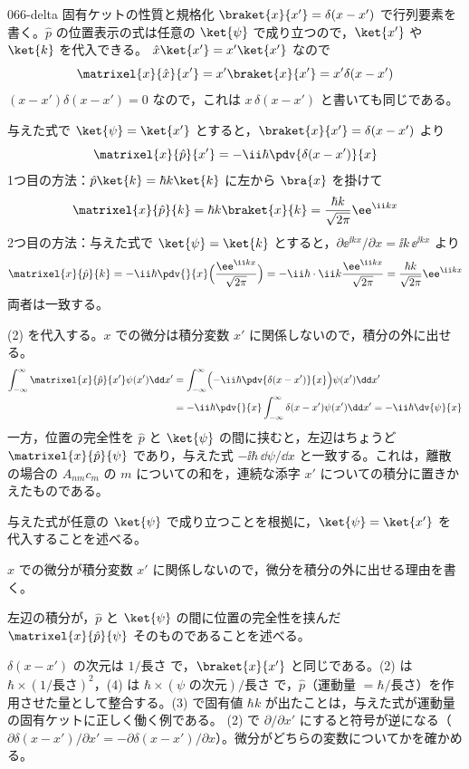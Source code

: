\documentclass[uplatex,dvipdfmx,a4paper,11pt]{jsarticle}
\begin{document}
\begin{kaisetsu}{066-delta}
\houshin 固有ケットの性質と規格化 $\braket{x}{x'}=\delta(x-x')$ で行列要素を書く。$\hat{p}$ の位置表示の式は任意の $\ket{\psi}$ で成り立つので，$\ket{x'}$ や $\ket{k}$ を代入できる。
\keisan {} $\hat{x}\ket{x'}=x'\ket{x'}$ なので
\[ \matrixel{x}{\hat{x}}{x'}=x'\braket{x}{x'}=x'\delta(x-x') \]
$(x-x')\delta(x-x')=0$ なので，これは $x\,\delta(x-x')$ と書いても同じである。

 与えた式で $\ket{\psi}=\ket{x'}$ とすると，$\braket{x}{x'}=\delta(x-x')$ より
\[ \matrixel{x}{\hat{p}}{x'}=-\ii\hbar\pdv{\delta(x-x')}{x} \]
 1つ目の方法：$\hat{p}\ket{k}=\hbar k\ket{k}$ に左から $\bra{x}$ を掛けて
\[ \matrixel{x}{\hat{p}}{k}=\hbar k\braket{x}{k}=\frac{\hbar k}{\sqrt{2\pi}}\ee^{\ii kx} \]
2つ目の方法：与えた式で $\ket{\psi}=\ket{k}$ とすると，$\partial\ee^{\ii kx}/\partial x=\ii k\,\ee^{\ii kx}$ より
\[ \matrixel{x}{\hat{p}}{k}=-\ii\hbar\pdv{}{x}\Bigl(\frac{\ee^{\ii kx}}{\sqrt{2\pi}}\Bigr)=-\ii\hbar\cdot\ii k\frac{\ee^{\ii kx}}{\sqrt{2\pi}}=\frac{\hbar k}{\sqrt{2\pi}}\ee^{\ii kx} \]
両者は一致する。

 (2) を代入する。$x$ での微分は積分変数 $x'$ に関係しないので，積分の外に出せる。
\begin{align*}
\int_{-\infty}^{\infty}\matrixel{x}{\hat{p}}{x'}\psi(x')\dd x'
&=\int_{-\infty}^{\infty}\Bigl(-\ii\hbar\pdv{\delta(x-x')}{x}\Bigr)\psi(x')\dd x'\\
&=-\ii\hbar\pdv{}{x}\int_{-\infty}^{\infty}\delta(x-x')\psi(x')\dd x'=-\ii\hbar\dv{\psi}{x}
\end{align*}
一方，位置の完全性を $\hat{p}$ と $\ket{\psi}$ の間に挟むと，左辺はちょうど $\matrixel{x}{\hat{p}}{\psi}$ であり，与えた式 $-\ii\hbar\,\dd\psi/\dd x$ と一致する。これは，離散の場合の $A_{nm}c_{m}$ の $m$ についての和を，連続な添字 $x'$ についての積分に置きかえたものである。
\begin{ronten}
  \item {} 与えた式が任意の $\ket{\psi}$ で成り立つことを根拠に，$\ket{\psi}=\ket{x'}$ を代入することを述べる。
  \item {} $x$ での微分が積分変数 $x'$ に関係しないので，微分を積分の外に出せる理由を書く。
  \item {} 左辺の積分が，$\hat{p}$ と $\ket{\psi}$ の間に位置の完全性を挟んだ $\matrixel{x}{\hat{p}}{\psi}$ そのものであることを述べる。
\end{ronten}
\kenzan $\delta(x-x')$ の次元は $1/\text{長さ}$ で，$\braket{x}{x'}$ と同じである。(2) は $\hbar\times(1/\text{長さ})^{2}$，(4) は $\hbar\times(\psi\text{ の次元})/\text{長さ}$ で，$\hat{p}$（運動量 $=\hbar/\text{長さ}$）を作用させた量として整合する。(3) で固有値 $\hbar k$ が出たことは，与えた式が運動量の固有ケットに正しく働く例である。
\tsumazuki (2) で $\partial/\partial x'$ にすると符号が逆になる（$\partial\delta(x-x')/\partial x'=-\partial\delta(x-x')/\partial x$）。微分がどちらの変数についてかを確かめる。
\end{kaisetsu}
\end{document}
